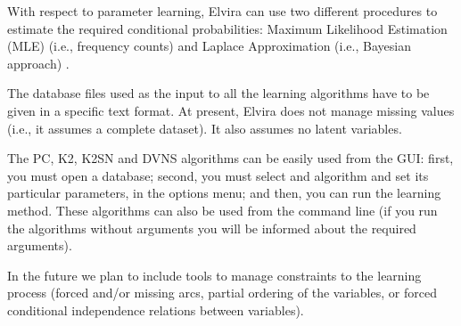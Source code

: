 With respect to parameter learning, Elvira can use two different procedures to estimate the required conditional probabilities: Maximum Likelihood Estimation (MLE) (i.e., frequency counts) and Laplace Approximation (i.e., Bayesian approach) \cite{CooHersk:k2}. 

The database files used as the input to all the learning algorithms have to be given in a specific text format. At present, Elvira does not manage missing values (i.e., it assumes a complete dataset). It also assumes no latent variables.

The PC, K2, K2SN and DVNS algorithms can be easily used from the GUI: first, you must open a database; second, you must select and algorithm and set its particular parameters, in the options menu; and then, you can run the learning method. These algorithms can also be used from the command line (if you run the algorithms without arguments you will be informed about the required arguments).

In the future we plan to include tools to manage constraints to the learning process
(forced and/or missing arcs, partial ordering of the variables, or forced conditional
independence relations between variables).

